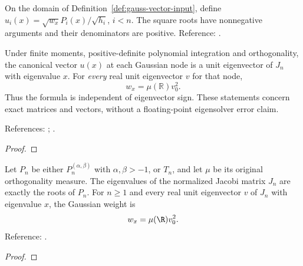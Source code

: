 \begin{definition}
\label{def:gauss-vector}
\leanok
On the domain of Definition~\ref{def:gauss-vector-input}, define $u_i(x)=\sqrt{w_x}P_i(x)/\sqrt{h_i}$,
$i<n$. The square roots have nonnegative arguments and their denominators
are positive. Reference: \cite[3.5(vi)]{dlmf}.
\end{definition}

\begin{theorem}
\label{thm:golub-welsch}
\leanok
Under finite moments, positive-definite polynomial integration and orthogonality,
the canonical vector $u(x)$ at each Gaussian node is a unit eigenvector of $J_n$
with eigenvalue $x$. For \emph{every} real unit eigenvector $v$ for that node,
\[
 w_x=\mu(\mathbb R)v_0^2.
\]
Thus the formula is independent of eigenvector sign. These statements concern
exact matrices and vectors, without a floating-point eigensolver error claim.

References: \cite[3.5(vi)]{dlmf}; \cite{golub-welsch}.
\end{theorem}
\begin{proof}
\leanok
\end{proof}

\begin{theorem}
\label{thm:classical-spectral-quadrature}
\leanok
Let $P_n$ be either $P_n^{(\alpha,\beta)}$ with $\alpha,\beta>-1$, or
$T_n$, and let $\mu$ be its original orthogonality measure.
The eigenvalues of the normalized Jacobi matrix $J_n$ are exactly the roots
of $P_n$. For $n\ge1$ and every real unit eigenvector $v$ of $J_n$ with
eigenvalue $x$, the Gaussian weight is
\[
 w_x=\mu(\R)v_0^2.
\]
Reference: \cite[3.5(vi)]{dlmf}.
\end{theorem}
\begin{proof}
\leanok
\end{proof}

